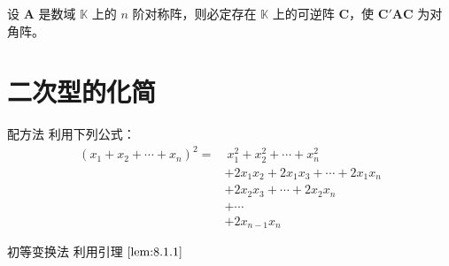 \begin{theorem}
    设 $\bm{A}$ 是数域 $\mathbb{K}$ 上的 $n$ 阶对称阵，则必定存在 $\mathbb{K}$ 上的可逆阵 $\bm{C}$，使 $\bm{C}'\bm{AC}$ 为对角阵。
\end{theorem}



\section{二次型的化简}

\begin{proposition}{配方法}
    利用下列公式：
    \begin{align*}
        (x_1 + x_2 + \cdots + x_n)^2 = & \ x_{1}^{2} + x_{2}^{2} + \cdots + x_{n}^{2}       \\
                                       & + 2x_{1}x_{2} + 2x_{1}x_{3} + \cdots + 2x_{1}x_{n} \\
                                       & + 2x_{2}x_{3} + \cdots + 2x_{2}x_{n}               \\
                                       & + \cdots                                           \\
                                       & + 2x_{n - 1}x_{n}
    \end{align*}
\end{proposition}

\begin{proposition}{初等变换法}
    利用引理 $\ref{lem:8.1.1}$
\end{proposition}






\section{}







\section{}







